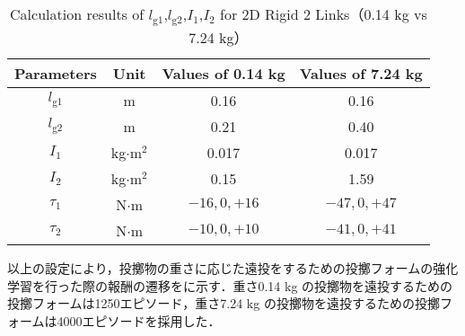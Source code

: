 \begin{table}[tb]
  \begin{center}
    \caption{Calculation results of $l_{\mathrm{g1}}$,$l_{\mathrm{g2}}$,$I_{1}$,$I_{2}$ for 2D Rigid 2 Links（0.14 kg vs 7.24 kg）}
    \begin{tabular}{c|c|c|c}
      \hline
      Parameters & Unit & Values of 0.14 kg & Values of 7.24 kg \\
      \hline
      $l_{\mathrm{g1}}$ & m & 0.16 & 0.16 \\
      $l_{\mathrm{g2}}$ & m & 0.21 & 0.40 \\
      $I_{1}$ & kg$\cdot$$\mathrm{m}^2$ & 0.017 & 0.017 \\
      $I_{2}$ & kg$\cdot$$\mathrm{m}^2$ & 0.15 & 1.59 \\
      $\tau_{1}$ & N$\cdot$m & $-16, 0, +16$ & $-47, 0, +47 $\\
      $\tau_{2}$ & N$\cdot$m & $-10, 0, +10$ & $-41, 0, +41 $\\
      \hline
    \end{tabular}
  \end{center}
\end{table}
以上の設定により，投擲物の重さに応じた遠投をするための投擲フォームの強化学習を行った際の報酬の遷移をに示す．重さ0.14 kg の投擲物を遠投するための投擲フォームは1250エピソード，重さ7.24 kg の投擲物を遠投するための投擲フォームは4000エピソードを採用した．

